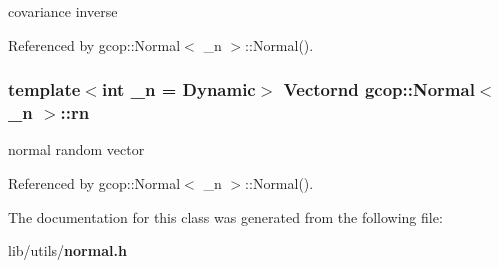 covariance inverse 



\-Referenced by gcop\-::\-Normal$<$ \-\_\-n $>$\-::\-Normal().

\subsubsection[{rn}]{\setlength{\rightskip}{0pt plus 5cm}template$<$int \-\_\-n = \-Dynamic$>$ {\bf \-Vectornd} {\bf gcop\-::\-Normal}$<$ \-\_\-n $>$\-::{\bf rn}}\label{classgcop_1_1Normal_a0d14362b29d58eea8b5e9ea19d1db5a8}


normal random vector 



\-Referenced by gcop\-::\-Normal$<$ \-\_\-n $>$\-::\-Normal().



\-The documentation for this class was generated from the following file\-:\begin{DoxyCompactItemize}
\item 
lib/utils/{\bf normal.\-h}\end{DoxyCompactItemize}
